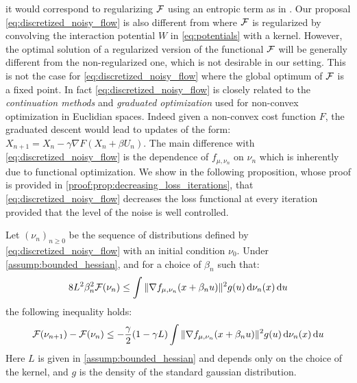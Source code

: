 it would correspond to regularizing ${{\mathcal F}}$ using an entropic term as in \cite{mei2018mean,Simsekli:2018}. Our proposal \cref{eq:discretized_noisy_flow} is also different from \cite{craig2016blob,carrillo2019blob} where ${{\mathcal F}}$ is regularized by convolving the interaction potential $W$ in \cref{eq:potentials} with a kernel. However, the optimal solution of a regularized version of the functional ${{\mathcal F}}$ will be generally different from the non-regularized one, which is not desirable in our setting. This is not the case for \cref{eq:discretized_noisy_flow} where the global optimum of ${{\mathcal F}}$ is a fixed point.  
In fact \cref{eq:discretized_noisy_flow} is  closely related to the \textit{continuation methods} \cite{Gulcehre:2016a,Gulcehre:2016,Chaudhari:2017}  and \textit{graduated optimization} \cite{Hazan:2015} used for non-convex optimization in Euclidian spaces. Indeed given a non-convex cost function $F$, the graduated descent would lead to updates of the form: $X_{n+1} = X_n - \gamma \nabla F(X_n+\beta U_n )$. The main difference with \cref{eq:discretized_noisy_flow} is the dependence of $f_{\mu, \nu_n}$ on $\nu_n$ which is inherently due to functional optimization.
We show in the following proposition, whose proof is provided in \cref{proof:prop:decreasing_loss_iterations}, that \cref{eq:discretized_noisy_flow} decreases the loss functional at every iteration provided that the level of the noise is well controlled.
\begin{proposition}\label{prop:decreasing_loss_iterations}
	Let $(\nu_n)_{n\geq 0}$ be the sequence of distributions defined by \cref{eq:discretized_noisy_flow} with an initial condition $\nu_0$. Under \cref{assump:bounded_hessian}, and for a choice of $\beta_n$ such that:
	\begin{align}\label{eq:control_level_noise}
		8L^2\beta_n^2 {{\mathcal F}}(\nu_n) \leq \int \Vert \nabla f_{\mu,\nu_n}(x+\beta_n u) \Vert^2 g(u) \mathop{}\!\mathrm{d} \nu_n(x)\mathop{}\!\mathrm{d} u   
	\end{align}
	 the following inequality holds:
	\begin{align}\label{eq:decreasing_loss_iterations}
		{{\mathcal F}}(\nu_{n+1}) - {{\mathcal F}}(\nu_n  ) \leq -\frac{\gamma}{2}(1-\gamma L)\int \Vert \nabla f_{\mu,\nu_n}(x+\beta_n u) \Vert^2 g(u) \mathop{}\!\mathrm{d}\nu_n(x) \mathop{}\!\mathrm{d} u
	\end{align}
	Here $L$ is given in \cref{assump:bounded_hessian} and depends only on the choice of the kernel, and $g$ is the density of the standard gaussian distribution.
\end{proposition}

